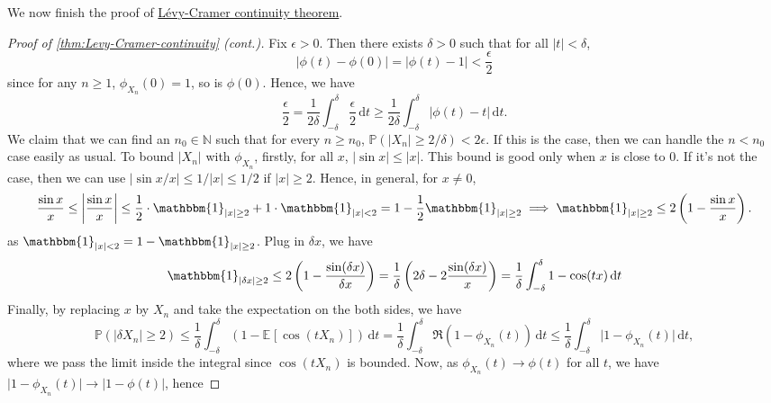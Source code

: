 We now finish the proof of \hyperref[thm:Levy-Cramer-continuity]{Lévy-Cramer continuity theorem}.

\begin{proof}[Proof of \autoref{thm:Levy-Cramer-continuity} (cont.)]\label{pf:thm:Levy-Cramer-continuity}
	Fix \(\epsilon > 0\). Then there exists \(\delta > 0\) such that for all \(\vert t \vert < \delta \),
	\[
		\vert \phi (t) - \phi (0) \vert
		= \vert \phi (t) - 1 \vert
		< \frac{\epsilon }{2}
	\]
	since for any \(n \geq 1\), \(\phi _{X_n}(0) = 1\), so is \(\phi (0)\). Hence, we have
	\[
		\frac{\epsilon }{2}
		= \frac{1}{2\delta } \int_{-\delta }^{\delta } \frac{\epsilon }{2} \,\mathrm{d}t
		\geq \frac{1}{2\delta } \int_{-\delta }^{\delta } \vert \phi (t) - t \vert  \,\mathrm{d}t .
	\]
	We claim that we can find an \(n_0 \in \mathbb{N} \) such that for every \(n \geq n_0\), \(\mathbb{P} (\vert X_n \vert \geq 2 / \delta ) < 2 \epsilon \). If this is the case, then we can handle the \(n < n_0\) case easily as usual. To bound \(\vert X_n \vert \) with \(\phi _{X_n}\), firstly, for all \(x\), \(\vert \sin x \vert \leq \vert x \vert \). This bound is good only when \(x\) is close to \(0\). If it's not the case, then we can use \(\vert \sin x / x \vert \leq 1 / \vert x \vert \leq 1 / 2\) if \(\vert x \vert \geq 2\). Hence, in general, for \(x \neq 0\),
	\[
		\frac{\sin x}{x}
		\leq \left\vert \frac{\sin x}{x} \right\vert
		\leq \frac{1}{2} \cdot \mathbbm{1}_{\vert x \vert \geq 2} + 1 \cdot \mathbbm{1}_{\vert x \vert < 2}
		= 1 - \frac{1}{2} \mathbbm{1}_{\vert x \vert \geq 2}
		\implies \mathbbm{1}_{\vert x \vert \geq 2}
		\leq 2 \left( 1 - \frac{\sin x}{x} \right).
	\]
	as \(\mathbbm{1}_{\vert x \vert < 2} = 1 - \mathbbm{1}_{\vert x \vert \geq 2} \). Plug in \(\delta x\), we have
	\[
		\mathbbm{1}_{\vert \delta x \vert \geq 2}
		\leq 2 \left( 1 - \frac{\sin (\delta x)}{\delta x} \right)
		= \frac{1}{\delta } \left( 2\delta - 2 \frac{\sin (\delta x)}{x} \right)
		= \frac{1}{\delta } \int_{-\delta }^{\delta } 1 - \cos (tx) \,\mathrm{d}t
	\]
	Finally, by replacing \(x\) by \(X_n\) and take the expectation on the both sides, we have
	\[
		\mathbb{P} (\vert \delta X_n \vert \geq 2)
		\leq \frac{1}{\delta } \int_{-\delta }^{\delta } \left( 1 - \mathbb{E}_{}[\cos (t X_n)] \right) \,\mathrm{d}t
		= \frac{1}{\delta } \int_{-\delta }^{\delta } \Re (1 - \phi _{X_n}(t)) \,\mathrm{d}t
		\leq \frac{1}{\delta } \int_{-\delta }^{\delta } \vert 1 - \phi _{X_n}(t) \vert  \,\mathrm{d}t,
	\]
	where we pass the limit inside the integral since \(\cos (t X_n)\) is bounded. Now, as \(\phi _{X_n}(t) \to \phi (t)\) for all \(t\), we have \(\vert 1 - \phi _{X_n}(t) \vert \to \vert 1 - \phi (t) \vert \), hence

\end{proof}
